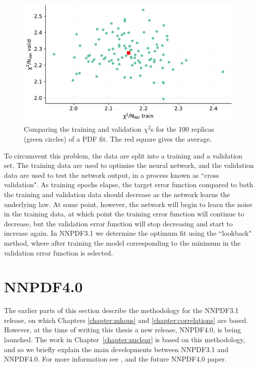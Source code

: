 \begin{figure}[h]
\centering
\includegraphics[width=\textwidth]{background/trvalchi2.pdf}
\caption{\label{fig:trvalchi2}Comparing the training and validation $\chi^2$s for the 100 replicas (green circles) of a PDF fit. The red square gives the average.}
\end{figure}

To circumvent this problem, the data are split into a training and a validation set. The training data are used to optimise the neural network, and the validation data are used to test the network output, in a process known as ``cross validation". As training epochs elapse, the target error function compared to both the training and validation data should decrease as the network learns the underlying law. At some point, however, the network will begin to learn the noise in the training data, at which point the training error function will continue to decrease, but the validation error function will stop decreasing and start to increase again. In NNPDF3.1 we determine the optimum fit using the ``lookback" method, where after training the model corresponding to the minimum in the validation error function is selected.

\section{NNPDF4.0}
The earlier parts of this section describe the methodology for the NNPDF3.1~\cite{Ball:2017nwa} release, on which Chapters \ref{chapter:mhous} and \ref{chapter:correlations} are based. However, at the time of writing this thesis a new release, NNPDF4.0, is being launched. The work in Chapter~\ref{chapter:nuclear} is based on this methodology, and so we briefly explain the main developments between NNPDF3.1 and NNPDF4.0. For more information see \cite{PDF4LHC, EmanueleTalk}, and the future NNPDF4.0 paper.

